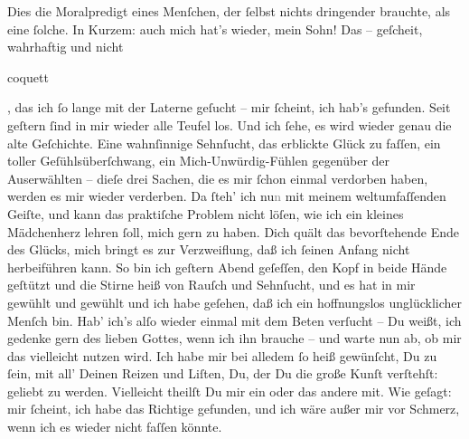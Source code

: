 \pstart
           Dies die Moralpredigt eines Menſchen, der ſelbst nichts dringender brauchte, als eine
               ſolche. In Kurzem: auch mich hat’s wieder, mein Sohn! Das \label{K_L02649-4v}\label{K_L02649-4} – geſcheit, wahrhaftig und nicht \begin{otherlanguage}{french}coquett\end{otherlanguage}, das ich ſo lange mit der Laterne geſucht – mir
               ſcheint, ich hab’s gefunden. Seit geſtern ſind in mir
               wieder alle Teufel los. Und ich ſehe, es wird wieder genau die alte Geſchichte. Eine
               wahnſinnige Sehnſucht, das erblickte Glück zu faſſen, ein toller Geſühlsüberſchwang,
               ein Mich-Unwürdig-Fühlen gegenüber der Auserwählten – dieſe drei Sachen, die es mir ſchon einmal
               verdorben haben, werden es mir wieder verderben. Da ſteh’ ich {\pb}nu\textcolor{gray}{n} mit meinem weltumfaſſenden
               Geiſte, und kann das praktiſche Problem nicht löſen, wie ich ein kleines Mädchenherz lehren ſoll, mich
               gern zu haben. Dich quält das bevorſtehende Ende des Glücks, mich bringt es zur
               Verzweiflung, daß ich ſeinen Anfang nicht herbeiführen kann. So bin ich geſtern{ }Abend geſeſſen, den Kopf in beide Hände geſtützt und die Stirne heiß von
               Rauſch und Sehnſucht, und es hat in mir gewühlt und gewühlt und ich habe geſehen, daß
               ich ein hoffnungslos unglücklicher Menſch bin. Hab’ ich’s alſo wieder einmal mit dem
               Beten verſucht – Du weißt, ich gedenke gern des lieben Gottes, wenn ich ihn brauche –
               und warte nun ab, ob mir das vielleicht nutzen wird. Ich habe mir bei alledem ſo heiß
               gewünſcht, Du zu ſein, mit all' Deinen Reizen und \strikeout{\textcolor{gray}{Lüſten}} Liſten, Du, der Du die große Kunſt verſtehſt: geliebt zu werden. Vielleicht
               theilſt Du mir ein oder das andere \label{K_L02649-5v}\label{K_L02649-5} mit. Wie
               geſagt: mir ſcheint, ich habe das Richtige gefunden, und ich wäre außer mir vor
               Schmerz, wenn ich es wieder nicht faſſen könnte.\pend
           
